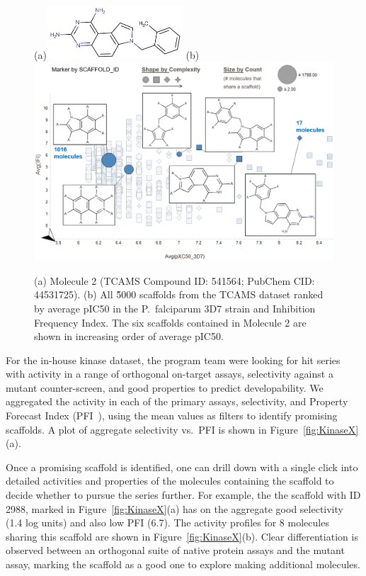 \documentclass[journal=jacsat,biochem,manuscript=article]{achemso}
\newcommand*\fref[1]{Figure~\ref{fig:#1}}
\newcommand*\vs{vs.~}
\begin{document}
\begin{figure}
  (a)\includegraphics[width=2in]{fig/tcam2_mol_541564_v2.png}
  (b)\includegraphics[width=5in]{fig/RGT_aggr_prop3.png}
  \caption{(a) Molecule 2 (TCAMS Compound ID: 541564; PubChem CID: 44531725).
    (b) All \~5000 scaffolds from the TCAMS dataset ranked by
    average pIC50 in the P.~falciparum 3D7 strain and Inhibition
    Frequency Index. The six scaffolds contained in Molecule 2
    are shown in increasing order of average pIC50.}
\label{fig:RGTaggr}   
\end{figure}

For the in-house kinase dataset, the program team were looking for hit series with activity in a range of orthogonal on-target assays, selectivity against a mutant counter-screen, and good properties to predict developability.  We aggregated the activity in each of the primary assays, selectivity, and Property Forecast Index (PFI~\cite{Young2011}), using the mean values as filters to identify promising scaffolds.  A plot of aggregate selectivity \vs PFI is shown in \fref{KinaseX}(a).

Once a promising scaffold is identified, one can drill down with a single click into detailed activities and properties of the molecules containing the scaffold to decide whether to pursue the series further. For example, the
the scaffold with ID 2988, marked in \fref{KinaseX}(a) has on the aggregate good selectivity (1.4 log units) and also low PFI (6.7). The activity profiles for 8
molecules sharing this scaffold are shown in \fref{KinaseX}(b). Clear differentiation is observed between an orthogonal suite of native protein assays and the mutant assay, marking the scaffold as a good one to explore making additional molecules.
\end{document}
